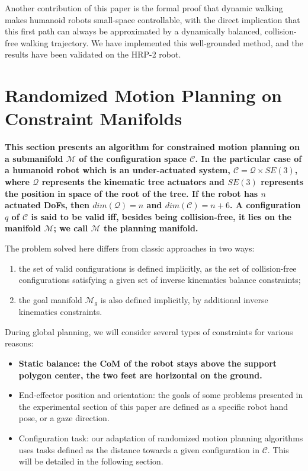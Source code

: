 \documentclass{article}
\newcommand\manifold{\mathcal{M}}
\newcommand\goalmanifold{\mathcal{M}_{g}}
\begin{document}
Another contribution of this paper is the formal proof that dynamic
walking makes humanoid robots small-space controllable, with the
direct implication that this first path can always be approximated by
a dynamically balanced, collision-free walking trajectory. We have
implemented this well-grounded method, and the results have been
validated on the HRP-2 robot.

\section{Randomized Motion Planning on Constraint Manifolds}
\label{sec:wb}

\textbf{This section presents an algorithm for constrained motion
  planning on a submanifold $\manifold$ of the configuration space
  $\mathcal{C}$. In the particular case of a humanoid robot which is
  an under-actuated system, $\mathcal{C}=\mathcal{Q} \times SE(3)$,
  where $\mathcal{Q}$ represents the kinematic tree actuators and
  $SE(3)$ represents the position in space of the root of the tree. If
  the robot has $n$ actuated DoFs, then $dim(\mathcal{Q})=n$ and
  $dim(\mathcal{C})=n+6$. A configuration $q$ of $\mathcal{C}$ is said
  to be valid iff, besides being collision-free, it lies on the
  manifold $\manifold$; we call $\manifold$ the planning manifold.}

The problem solved here differs from classic approaches in two ways:
\begin{enumerate}
\item the set of valid configurations is defined implicitly, as the
  set of collision-free configurations satisfying a given set of
  inverse kinematics balance constraints;
\item the goal manifold $\goalmanifold$ is also defined implicitly,
  by additional inverse kinematics constraints.
\end{enumerate}
During global planning, we will consider several types of constraints
for various reasons:
\begin{itemize}
\item \textbf{Static balance: the CoM of the robot stays above the support
  polygon center, the two feet are horizontal on the ground.}
\item End-effector position and orientation: the goals of some problems presented
  in the experimental section of this paper are defined as a specific robot hand pose,
  or a gaze direction.
\item Configuration task: our adaptation of randomized motion planning algorithms 
  uses tasks defined as the distance towards a given configuration in $\mathcal{C}$. 
  This will be detailed in the following section.
\end{itemize}
\end{document}
